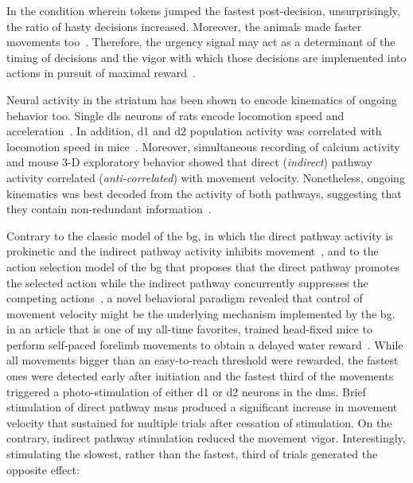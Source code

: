 In the condition wherein tokens jumped the fastest post-decision, unsurprisingly, the ratio of hasty decisions increased.
Moreover, the animals made faster movements too~\cite{Thura2014JNeurosci}.
Therefore, the urgency signal may act as a determinant of the timing of decisions and the vigor with which those decisions are implemented into actions in pursuit of maximal reward~\cite{Carland2019NeuroSci}.
\par
Neural activity in the striatum has been shown to encode kinematics of ongoing behavior too.
Single \gls{dls} neurons of rats encode locomotion speed and acceleration~\cite{Rueda2015NN}.
In addition, \gls{d1} and \gls{d2} population activity was correlated with locomotion speed in mice~\cite{Barbera2016Neuron}.
Moreover, simultaneous recording of calcium activity and mouse 3-D exploratory behavior showed that direct (\textit{indirect}) pathway activity correlated (\textit{anti-correlated}) with movement velocity.
Nonetheless, ongoing kinematics was best decoded from the activity of both pathways, suggesting that they contain non-redundant information~\cite{Markowitz2018Cell}.
\par
Contrary to the classic model of the \gls{bg}, in which the direct pathway activity is prokinetic and the indirect pathway activity inhibits movement~\cite{Kravitz2010Nature}, and to the action selection model of the \gls{bg} that proposes that the direct pathway promotes the selected action while the indirect pathway concurrently suppresses the competing actions~\cite{Cui2013Nature}, a novel behavioral paradigm revealed that control of movement velocity might be the underlying mechanism implemented by the \gls{bg}.
 in an article that is one of my all-time favorites, trained head-fixed mice to perform self-paced forelimb movements to obtain a delayed water reward~\cite{Yttri2016Nature}.
While all movements bigger than an easy-to-reach threshold were rewarded, the fastest ones were detected early after initiation and the fastest third of the movements triggered a photo-stimulation of either \gls{d1} or \gls{d2} neurons in the \gls{dms}.
Brief stimulation of direct pathway \glspl{msn} produced a significant increase in movement velocity that sustained for multiple trials after cessation of stimulation.
On the contrary, indirect pathway stimulation reduced the movement vigor.
Interestingly, stimulating the slowest, rather than the fastest, third of trials generated the opposite effect:
